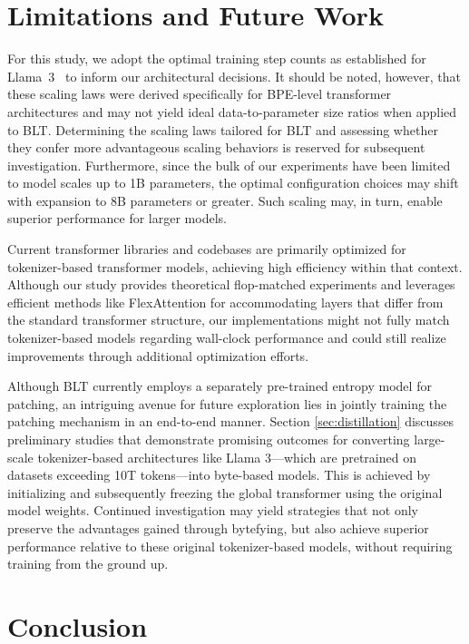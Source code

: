 \section{Limitations and Future Work}

For this study, we adopt the optimal training step counts as established for Llama~3~\citep{dubey2024llama} to inform our architectural decisions. It should be noted, however, that these scaling laws were derived specifically for BPE-level transformer architectures and may not yield ideal data-to-parameter size ratios when applied to {\textsc BLT}. Determining the scaling laws tailored for {\textsc BLT} and assessing whether they confer more advantageous scaling behaviors is reserved for subsequent investigation. Furthermore, since the bulk of our experiments have been limited to model scales up to 1B parameters, the optimal configuration choices may shift with expansion to 8B parameters or greater. Such scaling may, in turn, enable superior performance for larger models.

Current transformer libraries and codebases are primarily optimized for tokenizer-based transformer models, achieving high efficiency within that context. Although our study provides theoretical flop-matched experiments and leverages efficient methods like FlexAttention for accommodating layers that differ from the standard transformer structure, our implementations might not fully match tokenizer-based models regarding wall-clock performance and could still realize improvements through additional optimization efforts.

Although {\textsc BLT} currently employs a separately pre-trained entropy model for patching, an intriguing avenue for future exploration lies in jointly training the patching mechanism in an end-to-end manner. Section \ref{sec:distillation} discusses preliminary studies that demonstrate promising outcomes for converting large-scale tokenizer-based architectures like Llama 3—which are pretrained on datasets exceeding 10T tokens—into byte-based models. This is achieved by initializing and subsequently freezing the global transformer using the original model weights. Continued investigation may yield strategies that not only preserve the advantages gained through bytefying, but also achieve superior performance relative to these original tokenizer-based models, without requiring training from the ground up.

\section{Conclusion}
\label{section:conclusion}

